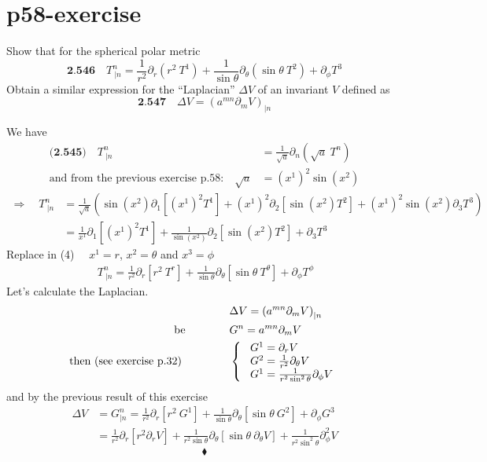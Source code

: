 \section{p58-exercise}
\begin{tcolorbox}
Show that for the spherical polar metric 
$$\textbf{2.546}\quad T^n_{\ |n} = \frac{1}{r^2}\partial_r(r^2 \ T^1) + \frac{1}{\sin \theta }\partial_{\theta}(\sin \theta\  T^2) + \partial_{\phi}T^3 $$
Obtain a similar expression for the ``Laplacian'' $\Delta V$ of an invariant $V$ defined as $$\textbf{2.547}\quad\Delta V = \left( a^{mn}\partial_m V\right)_{|n}$$
\end{tcolorbox}
We have
\begin{align}
\textbf{(2.545)}\quad T^n_{\ |n} &= \frac{1}{\sqrt{a}}\partial_n(\sqrt{a} \ T^n)\\
\text{and from the previous exercise p.58:}\quad \sqrt{a} &= (x^1)^2\sin(x^2)
\end{align}
\begin{align}
\Rightarrow \quad T^n_{\ |n} &= \frac{1}{\sqrt{a}}\left(\sin(x^2) \partial_1[(x^1)^2 T^1]  + (x^1)^2\partial_2 [ \sin (x^2)T^2] + (x^1)^2 \sin (x^2)\partial_3 T^3 \right)\\
&= \frac{1}{x^1} \partial_1[(x^1)^2 T^1]  + \frac{1}{\sin (x^2)}\partial_2 [ \sin (x^2)T^2] + \partial_3 T^3 
\end{align}
Replace in (4) $\quad x^1 =r$, $x^2 =  \theta$ and $x^3 = \phi$
\begin{align}
\ T^n_{\ |n} = \frac{1}{r^2} \partial_r [r^2 \ T^r]  + \frac{1}{\sin \theta}\partial_{\theta} [ \sin \theta \ T^{\theta}] + \partial_{\phi} T^{\phi} 
\end{align}
Let's calculate the Laplacian.
\begin{align}
&\Delta V = \left( a^{mn}\partial_m V\right)_{|n}\\
\text{be}\quad\quad\quad\quad & G^n = a^{mn}\partial_m V\\
\text{then (see exercise p.32) } \quad\quad\quad\quad & \left\{ \begin{array}{l}
\ G^1 = \partial_r V\\
\ G^2 = \frac{1}{r^2}\partial_{\theta} V\\
\ G^1 = \frac{1}{r^2 \sin ^2 \theta}\partial_{\phi} V\\
\end{array}\right.
\end{align}
and by the previous result of this exercise
\begin{align}
\Delta V &= G^n_{|n} = \frac{1}{r^2} \partial_r [r^2 \ G^1]  + \frac{1}{\sin \theta}\partial_{\theta} [ \sin \theta \ G^{2}] + \partial_{\phi} G^{3} \\
\ &= \frac{1}{r^2} \partial_r [r^2 \partial_r V]  + \frac{1}{r^2 \sin \theta}\partial_{\theta} [ \sin \theta \ \partial_{\theta} V] + \frac{1}{r^2 \sin ^2 \theta}\partial^2_{\phi} V
\end{align}
$$\blacklozenge$$
\newpage

